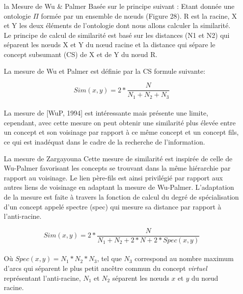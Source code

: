   \begin{itemize}
  \item [la Mesure de Wu \& Palmer] Basée sur le principe suivant :
    Etant donnée une ontologie $\Pi$ formée par un ensemble de nœuds
    (Figure 28). R est la racine, X et Y les deux éléments de
    l’ontologie dont nous allons calculer la similarité. Le principe
    de calcul de similarité est basé sur les distances (N1 et N2) qui
    séparent les nœuds X et Y du nœud racine et la distance qui sépare
    le concept subsumant (CS) de X et de Y du nœud R.

    La mesure de Wu et Palmer est définie par la CS formule suivante:

    \begin{equation}
      \label{wu_palmer}
      Sim(x,y) = 2 *  \frac{N}{N_{1} + N_{2} + N_{3}}
    \end{equation}\\

    La mesure de [WuP, 1994] est intéressante mais présente une
    limite, cependant, avec cette mesure on peut obtenir une
    similarité plus élevée entre un concept et son voisinage par
    rapport à ce même concept et un concept fils, ce qui est inadéquat
    dans le cadre de la recherche de l’information.\\

  \item [La mesure de Zargayouna]
    Cette mesure de similarité est inspirée de celle de Wu-Palmer
    favorisant les concepts se trouvant dans la même hiérarchie par
    rapport au voisinage. Le lien père-fils est ainsi privilégié par
    rapport aux autres liens de voisinage en adaptant la mesure de
    Wu-Palmer. L'adaptation de la mesure est faite à travers la
    fonction de calcul du degré de spécialisation d'un concept appelé
    spectre (spec) qui mesure sa distance par rapport à l'anti-racine.

    \begin{equation}
      \label{zargayouna}
      Sim(x,y)= 2 * \frac{N}{N_{1} + N_{2} + 2 * N + 2 * Spec(x,y)}
    \end{equation}\\

    Où $Spec(x,y)=N_{1}*N_{2} *N_{3}$, tel que $N_{3}$ correspond au
    nombre maximum d'arcs qui séparent le plus petit ancêtre commun du
    concept \textit{virtuel} représentant l'anti-racine, $N_{1}$ et
    $N_{2}$ séparent les nœuds $x$ et $y$ du nœud racine.\\
  \end{itemize}

